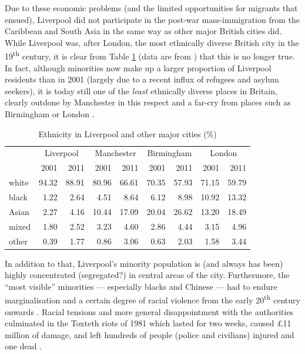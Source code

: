 Due to these economic problems (and the limited opportunities for migrants that ensued), Liverpool did not participate in the post-war mass-immigration from the Caribbean and South Asia in the same way as other major British cities did.
While Liverpool was, after London, the most ethnically diverse British city in the 19\textsuperscript{th} century, it is clear from Table \ref{tab.ethnicity} (data are from \citealt{nomis}) that this is no longer true.
In fact, although minorities now make up a larger proportion of Liverpool residents than in 2001 (largely due to a recent influx of refugees and asylum seekers), it is today still one of the \emph{least} ethnically diverse places in Britain, clearly outdone by Manchester in this respect and a far-cry from places such as Birmingham or London \citep[cf.][187]{pooley2006}.

	\begin{table}[h]
		\centering
		\caption{Ethnicity in Liverpool and other major cities (\%)}
		\begin{tabular}{lrrrrrrrr}
			\hline
	 		& \multicolumn{2}{c}{Liverpool} & \multicolumn{2}{c}{Manchester} & \multicolumn{2}{c}{Birmingham} & \multicolumn{2}{c}{London} \\
			 & 2001 & 2011 & 2001 & 2011 & 2001 & 2011 & 2001 & 2011 \\
			 \hline
			 white & 94.32 & 88.91 & 80.96 & 66.61 & 70.35 & 57.93 & 71.15 & 59.79 \\
			 black & 1.22 & 2.64 & 4.51 & 8.64 & 6.12 & 8.98 & 10.92 & 13.32 \\
	 		 Asian & 2.27 & 4.16 & 10.44 & 17.09 & 20.04 & 26.62 & 13.20 & 18.49 \\
	 		 mixed & 1.80 & 2.52 & 3.23 & 4.60 & 2.86 & 4.44 & 3.15 & 4.96 \\
	 		 other & 0.39 & 1.77 & 0.86 & 3.06 & 0.63 & 2.03 & 1.58 & 3.44 \\
	 		 \hline
		\end{tabular}
		\label{tab.ethnicity}
	\end{table}

In addition to that, Liverpool's minority population is (and always has been) highly concentrated (segregated?) in central areas of the city.
Furthermore, the ``most visible'' minorities --- especially blacks and Chinese --- had to endure marginalisation and a certain degree of racial violence from the early 20\textsuperscript{th} century onwards \citep[cf.][189--191]{pooley2006}.
Racial tensions and more general disappointment with the authorities culminated in the Toxteth riots of 1981 which lasted for two weeks, caused \pounds11 million of damage, and left hundreds of people (police and civilians) injured and one dead \citep[cf][440--444]{murden2006}.

